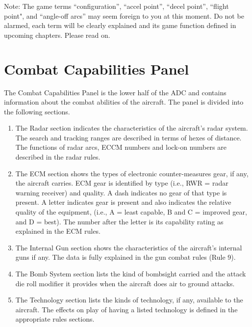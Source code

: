 Note: The game terms “configuration”, “accel point”, “decel point”, “flight point", and “angle-off arcs” may seem foreign to you at this moment. Do not be alarmed, each term will be clearly explained and its game function defined in upcoming chapters. Please read on.

\section{Combat Capabilities Panel}

The Combat Capabilities Panel is the lower half of the ADC and contains information about the combat abilities of the aircraft.  The panel is divided into the following sections.

\begin{enumerate}[resume]

    \item {} 
    The Radar section indicates the characteristics of the aircraft's radar system. The search and tracking ranges are described in terms of hexes of distance. The functions of radar arcs, ECCM numbers and lock-on numbers are described in the radar rules.

    \item {} 
    The ECM section shows the types of electronic counter-measures gear, if any, the aircraft carries. ECM gear is identified by type (i.e., RWR = radar warning receiver) and quality. A dash indicates no gear of that type is present. A letter indicates gear is present and also indicates the relative quality of the equipment, (i.e., A = least capable, B and C = improved gear, and D = best). The number after the letter is its capability rating as explained in the ECM rules.

    \item {} 
    The Internal Gun section shows the characteristics of the aircraft's internal guns if any. The data is fully explained in the gun combat rules (Rule 9).

    \item {} 
    The Bomb System section lists the kind of bombsight carried and the attack die roll modifier it provides when the aircraft does air to ground attacks.

    \item {}
    The Technology section lists the kinds of technology, if any, available to the aircraft. The effects on play of having a listed technology is defined in the appropriate rules sections.


\end{enumerate}
